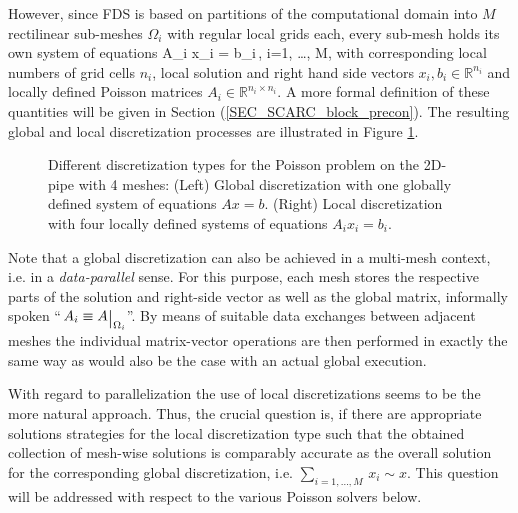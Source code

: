 However, since FDS is based on partitions of the computational domain into $M$ rectilinear sub-meshes $\Omega_i$ with regular local grids each, every sub-mesh holds its own system of equations 
\be 
   A_i x_i = b_i\,, \qquad i=1, \ldots, M, 
  \label{EQ_SCARC_multi_system}
\ee
with corresponding local numbers of grid cells $n_i$,  local solution and right hand side vectors $x_i, b_i \in \mathbb{R}^{n_i}$ and locally defined Poisson matrices $A_i \in \mathbb{R}^{n_i \times n_i}$. 
A more formal definition of these quantities will be given in Section (\ref{SEC_SCARC_block_precon}).
The resulting global and local discretization processes are illustrated in Figure \ref{FIG_SCARC_global_vs_local_discretization}.



\begin{figure}[ht]
\begin{center}
\quad\quad

\end{center}
\caption[Global discretization versus collection of local discretizations]{Different discretization types for the Poisson problem on the 2D-pipe with 4 meshes: (Left) Global discretization with one globally defined system of equations $Ax=b$. (Right) Local discretization with four locally defined systems of equations $A_i x_i=b_i$.}
\label{FIG_SCARC_global_vs_local_discretization}
\end{figure}
Note that a global discretization can also be achieved in a multi-mesh context, i.e. in a {\it data-parallel} sense. 
For this purpose, each mesh stores the respective parts of the solution and right-side vector as well as the global matrix, 
informally spoken ``$\,A_i \equiv \restrict{A}{\Omega_i}$''.
By means of suitable data exchanges between adjacent meshes the individual matrix-vector operations are then performed 
in exactly the same way as would also be the case with an actual global execution.

With regard to parallelization the use of local discretizations seems to be the more natural approach. 
Thus, the crucial question is, if there are appropriate solutions strategies for the local discretization type 
such that the obtained collection of mesh-wise solutions is comparably accurate as the overall solution for the corresponding global discretization, i.e. $\sum_{i=1, \ldots, M}\, x_i \sim x$. 
This question will be addressed with respect to the various Poisson solvers below.


